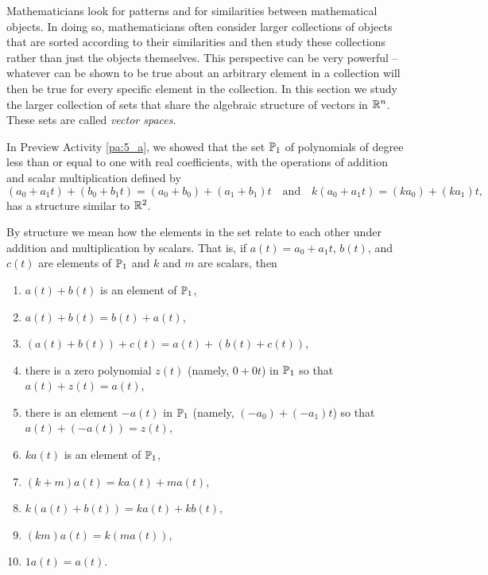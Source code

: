 \label{sec:space_like_rn}

Mathematicians look for patterns and for similarities between mathematical objects. In doing so, mathematicians often consider larger collections of objects that are sorted according to their similarities and then study these collections rather than just the objects themselves. This perspective can be very powerful -- whatever can be shown to be true about an arbitrary element in a collection will then be true for every specific element in the collection. In this section we study the larger collection of sets that share the algebraic structure of vectors in $\mathbb{R}^n$. These sets are called  \emph{vector spaces}.

In Preview Activity \ref{pa:5_a}, we showed that the set $\mathbb{P}_1$ of polynomials of degree less than or equal to one with real coefficients, with the operations of addition and scalar multiplication defined by 
\[(a_0+a_1t)+(b_0+b_1t) = (a_0+b_0) + (a_1+b_1)t \ \ \ \text{ and } \ \ \ k(a_0+a_1t) = (ka_0) + (ka_1)t,\]
has a structure similar to $\mathbb{R}^2$.

By structure we mean how the elements in the set relate to each other under addition and multiplication by scalars. That is, if $a(t)=a_0+a_1t$, $b(t)$, and $c(t)$ are elements of $\mathbb{P}_1$ and $k$ and $m$ are scalars, then 
\begin{enumerate}
\item $a(t) + b(t)$ is an element of $\mathbb{P}_1$,
\item $a(t)+b(t) = b(t) + a(t)$,
\item $(a(t)+b(t)) + c(t) = a(t) + (b(t)+c(t))$,
\item there is a zero polynomial $z(t)$ (namely, $0+0t$) in $\mathbb{P}_1$ so that $a(t) + z(t) = a(t)$,
\item there is an element $-a(t)$ in $\mathbb{P}_1$ (namely, $(-a_0)+(-a_1)t$) so that $a(t) + (-a(t)) = z(t)$,
\item $k a(t)$ is an element of $\mathbb{P}_1$,
\item $(k+m) a(t) = ka(t) + ma(t)$,
\item $k(a(t)+b(t)) = ka(t) + kb(t)$,
\item $(km) a(t) = k(m a(t))$,
\item $1 a(t) = a(t)$.
\end{enumerate}

